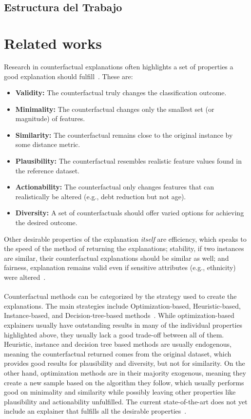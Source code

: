 \documentclass[12pt]{extarticle}
\numberwithin{equation}{section}
\begin{document}
\subsection{Estructura del Trabajo} %

\section{Related works}
Research in counterfactual explanations often highlights a set of properties a good explanation should fulfill~\cite{guidotti2024counterfactual}. These are:
\begin{itemize}
  \item \textbf{Validity:} The counterfactual truly changes the classification outcome.
  \item \textbf{Minimality:} The counterfactual changes only the smallest set (or magnitude) of features.
  \item \textbf{Similarity:} The counterfactual remains close to the original instance by some distance metric.
  \item \textbf{Plausibility:} The counterfactual resembles realistic feature values found in the reference dataset.
  \item \textbf{Actionability:} The counterfactual only changes features that can realistically be altered (e.g., debt reduction but not age).
  \item \textbf{Diversity:} A set of counterfactuals should offer varied options for achieving the desired outcome.
\end{itemize}
Other desirable properties of the explanation \emph{itself} are
efficiency, which speaks to the speed of the method of returning the explanations; stability, if two instances are similar, their counterfactual explanations should be similar as well; and fairness, explanation remains valid even if sensitive attributes (e.g., ethnicity) were altered~\cite{guidotti2024counterfactual}.\\
\\
Counterfactual methods can be categorized by the strategy used to create the explanations. The main strategies include Optimization-based, Heuristic-based, Instance-based, and Decision-tree-based methods~\cite{guidotti2024counterfactual}. While optimization-based explainers usually have outstanding results in many of the individual properties highlighted above, they usually lack a good trade-off between all of them. Heuristic, instance and decision tree based methods are usually endogenous, meaning the counterfactual returned comes from the original dataset, which provides good results for plausibility and diversity, but not for similarity. On the other hand, optimization methods are in their majority exogenous, meaning they create a new sample based on the algorithm they follow, which usually performs good on minimality and similarity while possibly leaving other properties like plausibility and actionability unfulfilled. The current state-of-the-art does not yet include an explainer that fulfills all the desirable properties~\cite{guidotti2024counterfactual}.\\
\end{document}
